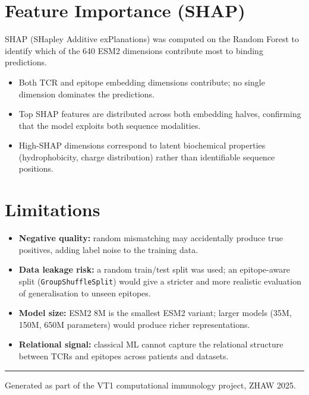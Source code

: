 \documentclass[11pt,a4paper]{article}
\begin{document}
\section{Feature Importance (SHAP)}

SHAP (SHapley Additive exPlanations) was computed on the Random Forest to identify
which of the 640 ESM2 dimensions contribute most to binding predictions.

\begin{itemize}[leftmargin=1.4em, itemsep=3pt]
  \item Both TCR and epitope embedding dimensions contribute;
        no single dimension dominates the predictions.
  \item Top SHAP features are distributed across both embedding halves,
        confirming that the model exploits both sequence modalities.
  \item High-SHAP dimensions correspond to latent biochemical properties
        (hydrophobicity, charge distribution) rather than identifiable
        sequence positions.
\end{itemize}

\section{Limitations}

\begin{itemize}[leftmargin=1.4em, itemsep=3pt]
  \item \textbf{Negative quality:} random mismatching may accidentally produce
        true positives, adding label noise to the training data.
  \item \textbf{Data leakage risk:} a random train/test split was used; an
        epitope-aware split (\texttt{GroupShuffleSplit}) would give a stricter
        and more realistic evaluation of generalisation to unseen epitopes.
  \item \textbf{Model size:} ESM2 8M is the smallest ESM2 variant; larger models
        (35M, 150M, 650M parameters) would produce richer representations.
  \item \textbf{Relational signal:} classical ML cannot capture the relational
        structure between TCRs and epitopes across patients and datasets.
\end{itemize}

\vspace{12pt}
\textcolor{mainblue}{\rule{\linewidth}{0.8pt}}
\begin{center}
\small\color{gray}
Generated as part of the VT1 computational immunology project, ZHAW 2025.
\end{center}
\end{document}
